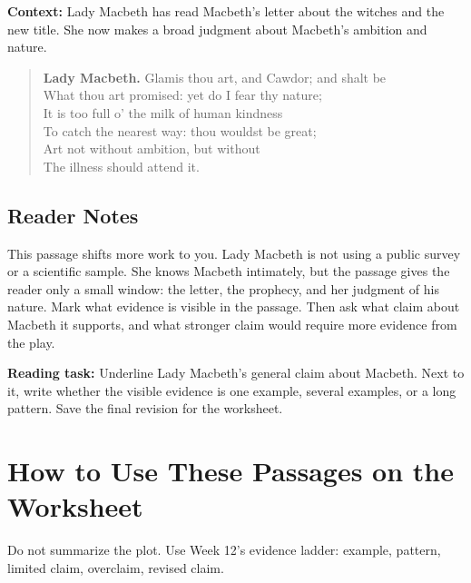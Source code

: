 \documentclass[12pt]{article}
\newenvironment{playpassage}{\begin{quote}\footnotesize\setlength{\parskip}{0.08em}\setlength{\parindent}{0pt}}{\end{quote}}
\newcommand{\speaker}[1]{\textbf{#1.}}
\begin{document}
\textbf{Context:} Lady Macbeth has read Macbeth's letter about the witches and the new title. She now makes a broad judgment about Macbeth's ambition and nature.

\begin{playpassage}
\speaker{Lady Macbeth} Glamis thou art, and Cawdor; and shalt be\\
What thou art promised: yet do I fear thy nature;\\
It is too full o' the milk of human kindness\\
To catch the nearest way: thou wouldst be great;\\
Art not without ambition, but without\\
The illness should attend it.
\end{playpassage}

\subsection*{Reader Notes}

This passage shifts more work to you. Lady Macbeth is not using a public survey or a scientific sample. She knows Macbeth intimately, but the passage gives the reader only a small window: the letter, the prophecy, and her judgment of his nature. Mark what evidence is visible in the passage. Then ask what claim about Macbeth it supports, and what stronger claim would require more evidence from the play.

\textbf{Reading task:} Underline Lady Macbeth's general claim about Macbeth. Next to it, write whether the visible evidence is one example, several examples, or a long pattern. Save the final revision for the worksheet.

\section*{How to Use These Passages on the Worksheet}

Do not summarize the plot. Use Week 12's evidence ladder: example, pattern, limited claim, overclaim, revised claim.
\end{document}
